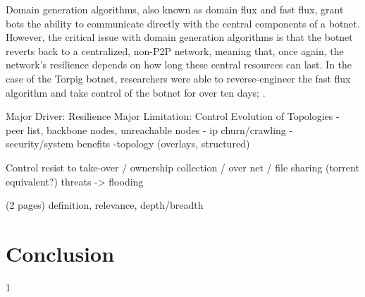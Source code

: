 \documentclass{acm_proc_article-sp}
\begin{document}
Domain generation algorithms, also known as domain flux and fast flux, grant bots the ability to communicate directly with the central components of a botnet.  However, the critical issue with domain generation algorithms is that the botnet reverts back to a centralized, non-P2P network, meaning that, once again, the network's resilience depends on how long these central resources can last.  In the case of the Torpig botnet, researchers were able to reverse-engineer the fast flux algorithm and take control of the botnet for over ten days; \cite{stone:takeover}.




Major Driver: Resilience
Major Limitation: Control
Evolution of Topologies
    - peer list, backbone nodes, unreachable nodes
    - ip churn/crawling
    - security/system benefits
    -topology (overlays, structured)


Control
resist to take-over / ownership
collection / 
over net / file sharing (torrent equivalent?)
threats -> flooding

(2 pages)
definition, relevance, depth/breadth


\section{Conclusion}


1


\printbibliography{}
\end{document}
